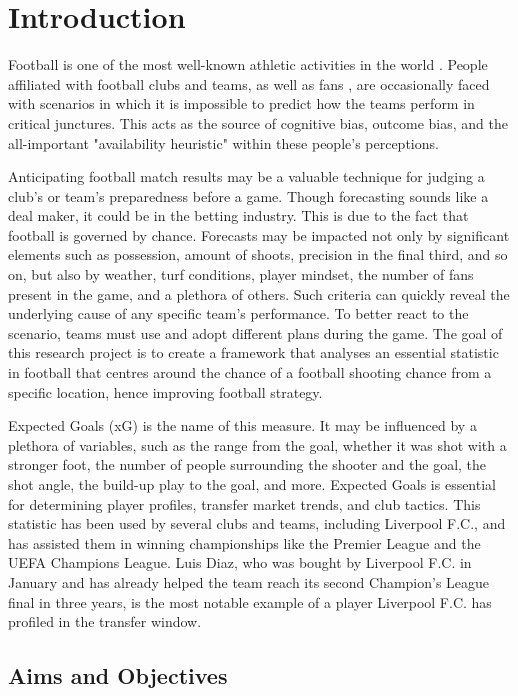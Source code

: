 \chapter{Introduction}\label{football}
Football is one of the most well-known athletic activities in the world \cite{giulianotti2012football}. People affiliated with football clubs and teams, as well as fans , are occasionally faced with scenarios in which it is impossible to predict how the teams perform in critical junctures. This acts as the source of cognitive bias, outcome bias, and the all-important "availability heuristic" within these people's perceptions. \cite{biermann2019football}

Anticipating football match results may be a valuable technique for judging a club's or team's preparedness before a game. Though forecasting  sounds like a deal maker, it could be in the betting industry. This is due to the fact that football is governed by chance. \cite{biermann2019football} Forecasts may be impacted not only by significant elements such as possession, amount of shoots, precision in the final third, and so on, but also by weather, turf conditions, player mindset, the number of fans present in the game, and a plethora of others. Such criteria can quickly reveal the underlying cause of any specific team's performance. To better react to the scenario, teams must use and adopt different plans during the game. The goal of this research project is to create a framework that analyses an essential statistic in football that centres around the chance of a football shooting chance from a specific location, hence improving football strategy. 

Expected Goals (xG) is the name of this measure. It may be influenced by a plethora of variables, such as the range from the goal, whether it was shot with a stronger foot, the number of people surrounding the shooter and the goal, the shot angle, the build-up play to the goal, and more. Expected Goals is essential for determining player profiles, transfer market trends, and club tactics. This statistic has been used by several clubs and teams, including Liverpool F.C., and has assisted them in winning championships like the Premier League and the UEFA Champions League. Luis Diaz, who was bought by Liverpool F.C. in January and has already helped the team reach its second Champion's League final in three years, is the most notable example of a player Liverpool F.C. has profiled in the transfer window. \cite{lichtenthaler2020mixing}

\section{Aims and Objectives}

